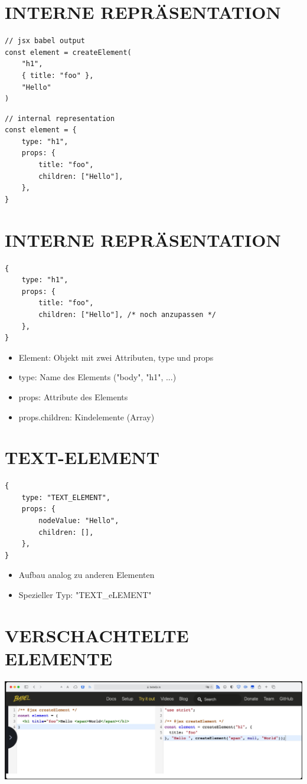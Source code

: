 \documentclass[10pt]{article}
\begin{document}
\section*{INTERNE REPRÄSENTATION}
\begin{verbatim}
// jsx babel output
const element = createElement(
    "h1",
    { title: "foo" },
    "Hello"
)
\end{verbatim}

\begin{verbatim}
// internal representation
const element = {
    type: "h1",
    props: {
        title: "foo",
        children: ["Hello"],
    },
}
\end{verbatim}

\section*{INTERNE REPRÄSENTATION}
\begin{verbatim}
{
    type: "h1",
    props: {
        title: "foo",
        children: ["Hello"], /* noch anzupassen */
    },
}
\end{verbatim}

\begin{itemize}
  \item Element: Objekt mit zwei Attributen, type und props
  \item type: Name des Elements ("body", "h1", ...)
  \item props: Attribute des Elements
  \item props.children: Kindelemente (Array)
\end{itemize}

\section*{TEXT-ELEMENT}
\begin{verbatim}
{
    type: "TEXT_ELEMENT",
    props: {
        nodeValue: "Hello",
        children: [],
    },
}
\end{verbatim}

\begin{itemize}
  \item Aufbau analog zu anderen Elementen
  \item Spezieller Typ: "TEXT\_eLEMENT"
\end{itemize}

\section*{VERSCHACHTELTE ELEMENTE}
\begin{center}
\includegraphics[width=\linewidth]{images/2025_01_02_254b5e4c52d090c313e1g-11}
\end{center}
\end{document}
